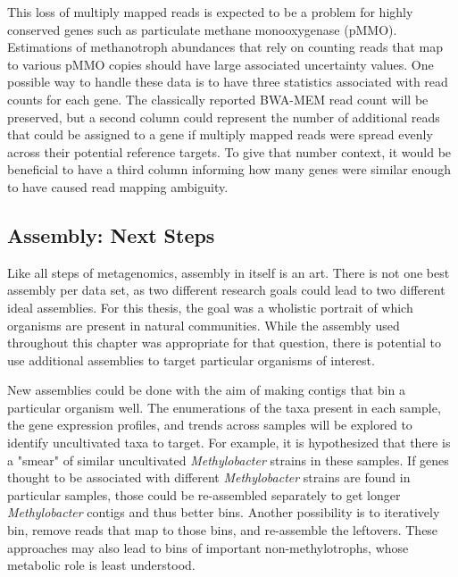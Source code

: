 This loss of multiply mapped reads is expected to be a problem for highly conserved genes such as particulate methane monooxygenase (pMMO).
Estimations of methanotroph abundances that rely on counting reads that map to various pMMO copies should have large associated uncertainty values.
One possible way to handle these data is to have three statistics associated with read counts for each gene.
The classically reported BWA-MEM read count will be preserved, but a second column could represent the number of additional reads that could be assigned to a gene if multiply mapped reads were spread evenly across their potential reference targets.
To give that number context, it would be beneficial to have a third column informing how many genes were similar enough to have caused read mapping ambiguity.

\subsection{Assembly: Next Steps}
\label{sect:assembly_discussion}

Like all steps of metagenomics, assembly in itself is an art.
There is not one best assembly per data set, as two different research goals could lead to two different ideal assemblies.
For this thesis, the goal was a wholistic portrait of which organisms are present in natural communities.
While the assembly used throughout this chapter was appropriate for that question, there is potential to use additional assemblies to target particular organisms of interest.

New assemblies could be done with the aim of making contigs that bin a particular organism well.
The enumerations of the taxa present in each sample, the gene expression profiles, and trends across samples will be explored to identify uncultivated taxa to target.
For example, it is hypothesized that there is a "smear" of similar uncultivated \textit{Methylobacter} strains in these samples.
If genes thought to be associated with different \textit{Methylobacter} strains are found in particular samples, those could be re-assembled separately to get longer \textit{Methylobacter} contigs and thus better bins.
Another possibility is to iteratively bin, remove reads that map to those bins, and re-assemble the leftovers.
These approaches may also lead to bins of important non-methylotrophs, whose metabolic role is least understood.


